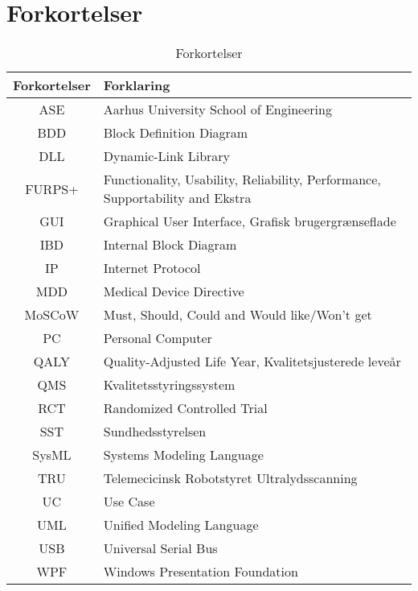 \chapter{Forkortelser}

\begin{table}[htb]
\centering
\begin{tabular}{ | c | p{} | }
\hline
\textbf{Forkortelser} & \textbf{Forklaring} \\\hline
ASE & Aarhus University School of Engineering \\\hline
BDD & Block Definition Diagram \\\hline
DLL & Dynamic-Link Library \\\hline
FURPS+ & Functionality, Usability, Reliability, Performance, Supportability and Ekstra \\\hline
GUI & Graphical User Interface, Grafisk brugergrænseflade \\\hline
IBD & Internal Block Diagram \\\hline
IP & Internet Protocol \\\hline
MDD & Medical Device Directive \\\hline
MoSCoW & Must, Should, Could and Would like/Won't get\\\hline
PC & Personal Computer \\\hline
QALY & Quality-Adjusted Life Year, Kvalitetsjusterede leveår  \\\hline
QMS & Kvalitetsstyringssystem \\\hline
RCT & Randomized Controlled Trial \\\hline
SST & Sundhedsstyrelsen \\\hline
SysML & Systems Modeling Language \\\hline
TRU & Telemecicinsk Robotstyret Ultralydsscanning \\\hline
UC & Use Case \\\hline
UML & Unified Modeling Language \\\hline
USB & Universal Serial Bus \\\hline
WPF & Windows Presentation Foundation \\\hline

\end{tabular}
\caption{Forkortelser}
\end{table}

\vspace{3cm}